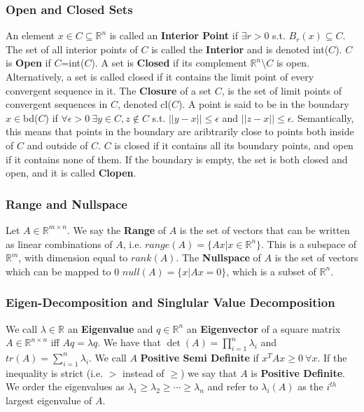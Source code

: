 \documentclass[]{article}
\theoremstyle{mattstyle}
\theoremstyle{definition}
\begin{document}
\newpage

\subsubsection{Open and Closed Sets}

An element $x \in C \subseteq \mathbb{R}^n$ is called an \textbf{Interior Point} if $\exists r>0$ s.t. $B_r(x) \subseteq C$. The set of all interior points of $C$ is called the \textbf{Interior} and is denoted int($C$). $C$ is \textbf{Open} if $C$=int($C$). A set is \textbf{Closed} if its complement $\mathbb{R}^n \setminus C$ is open. Alternatively, a set is called closed if it contains the limit point of every convergent sequence in it. The \textbf{Closure} of a set $C$, is the set of limit points of convergent sequences in $C$, denoted cl($C$). A point is said to be in the boundary $x \in $bd($C$) if $\forall \epsilon > 0 \ \exists y\in C, z \not\in C$ s.t. $||y-x||\le \epsilon$ and $ ||z - x|| \le \epsilon$. Semantically, this means that points in the boundary are aribtrarily close to points both inside of $C$ and outside of $C$. $C$ is closed if it contains all its boundary points, and open if it contains none of them. If the boundary is empty, the set is both closed and open, and it is called \textbf{Clopen}.

\subsubsection{Range and Nullspace}

Let $A \in \mathbb{R}^{m\times n}$. We say the \textbf{Range} of $A$ is the set of vectors that can be written as linear combinations of $A$, i.e. $range(A)=\{ Ax | x\in \mathbb{R}^n \}$. This is a subspace of $\mathbb{R}^m$, with dimension equal to $rank(A)$. The \textbf{Nullspace} of $A$ is the set of vectors which can be mapped to $0$ $null(A)=\{x|Ax=0\}$, which is a subset of $\mathbb{R}^n$.

\subsubsection{Eigen-Decomposition and Singlular Value Decomposition}

We call $\lambda\in \mathbb{R}$ an \textbf{Eigenvalue} and $q\in \mathbb{R}^n$ an \textbf{Eigenvector} of a square matrix $A\in\mathbb{R}^{n \times n}$ iff $Aq = \lambda q$. We have that $\det(A)=\prod_{i=1}^n\lambda_i$ and $tr(A)=\sum_{i=1}^n\lambda_i$. We call $A$ \textbf{Positive Semi Definite} if $x^TAx \ge 0 \ \forall x$. If the inequality is strict (i.e. $>$ instead of $\ge$) we say that $A$ is \textbf{Positive Definite}. We order the eigenvalues as $\lambda_1 \ge \lambda_2 \ge \cdots \ge \lambda_n$ and refer to $\lambda_i(A)$ as the $i^{th}$ largest eigenvalue of $A$.
\end{document}
